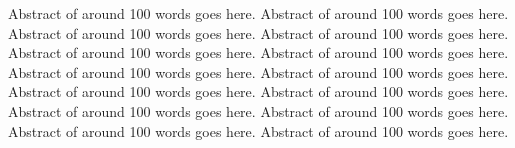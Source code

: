 Abstract of around 100 words goes here. Abstract of around 100 words goes here. Abstract of around 100 words goes here. Abstract of around 100 words goes here. Abstract of around 100 words goes here. Abstract of around 100 words goes here. Abstract of around 100 words goes here. Abstract of around 100 words goes here. Abstract of around 100 words goes here. Abstract of around 100 words goes here. Abstract of around 100 words goes here. Abstract of around 100 words goes here. Abstract of around 100 words goes here. Abstract of around 100 words goes here.
